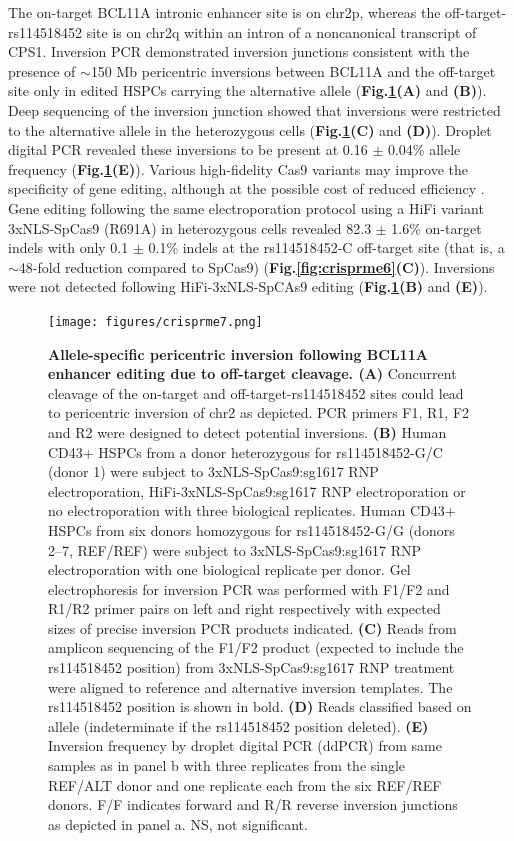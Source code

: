 \documentclass[a4paper, titlepage, openright]{book}
\begin{document}
The on-target BCL11A intronic enhancer site is on chr2p, whereas the off-target-rs114518452 site is on chr2q within an intron of a noncanonical transcript of CPS1. Inversion PCR demonstrated inversion junctions consistent with the presence of $\sim$150 Mb pericentric inversions between BCL11A and the off-target site only in edited HSPCs carrying the alternative allele (\textbf{Fig.\ref{fig:crisprme7}(A)} and \textbf{(B)}). Deep sequencing of the inversion junction showed that inversions were restricted to the alternative allele in the heterozygous cells (\textbf{Fig.\ref{fig:crisprme7}(C)} and \textbf{(D)}). Droplet digital PCR revealed these inversions to be present at 0.16 $\pm$ 0.04\% allele frequency (\textbf{Fig.\ref{fig:crisprme7}(E)}). Various high-fidelity Cas9 variants may improve the specificity of gene editing, although at the possible cost of reduced efficiency \citep{schmid2020highly}. Gene editing following the same electroporation protocol using a HiFi variant 3xNLS-SpCas9 (R691A) \citep{vakulskas2018high} in heterozygous cells revealed 82.3 $\pm$ 1.6\% on-target indels with only 0.1 $\pm$ 0.1\% indels at the rs114518452-C off-target site (that is, a $\sim$48-fold reduction compared to SpCas9) (\textbf{Fig.\ref{fig:crisprme6}(C)}). Inversions were not detected following HiFi-3xNLS-SpCAs9 editing (\textbf{Fig.\ref{fig:crisprme7}(B)} and \textbf{(E)}).
\begin{figure}
	\centering
	\texttt{[image: figures/crisprme7.png]}
	\caption[Allele-specific pericentric inversion following BCL11A enhancer editing due to off-target cleavage]{\textbf{Allele-specific pericentric inversion following BCL11A enhancer editing due to off-target cleavage. (A)} Concurrent cleavage of the on-target and off-target-rs114518452 sites could lead to pericentric inversion of chr2 as depicted. PCR primers F1, R1, F2 and R2 were designed to detect potential inversions. \textbf{(B)} Human CD43+ HSPCs from a donor heterozygous for rs114518452-G/C (donor 1) were subject to 3xNLS-SpCas9:sg1617 RNP electroporation, HiFi-3xNLS-SpCas9:sg1617 RNP electroporation or no electroporation with three biological replicates. Human CD43+ HSPCs from six donors homozygous for rs114518452-G/G (donors 2–7, REF/REF) were subject to 3xNLS-SpCas9:sg1617 RNP electroporation with one biological replicate per donor. Gel electrophoresis for inversion PCR was performed with F1/F2 and R1/R2 primer pairs on left and right respectively with expected sizes of precise inversion PCR products indicated. \textbf{(C)} Reads from amplicon sequencing of the F1/F2 product (expected to include the rs114518452 position) from 3xNLS-SpCas9:sg1617 RNP treatment were aligned to reference and alternative inversion templates. The rs114518452 position is shown in bold. \textbf{(D)} Reads classified based on allele (indeterminate if the rs114518452 position deleted). \textbf{(E)} Inversion frequency by droplet digital PCR (ddPCR) from same samples as in panel b with three replicates from the single REF/ALT donor and one replicate each from the six REF/REF donors. F/F indicates forward and R/R reverse inversion junctions as depicted in panel a. NS, not significant.}
	\label{fig:crisprme7}
\end{figure}
\end{document}
